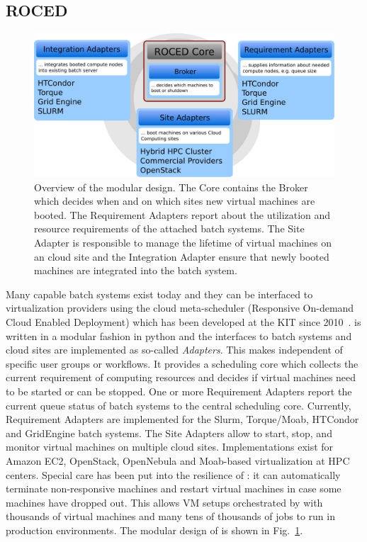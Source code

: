 \subsection{ROCED}
\begin{figure}
\begin{center}
  \includegraphics[width=0.9\linewidth]{figures/roced_design_flat.pdf}
  \caption{Overview of the \Roced modular design. The  \Roced Core contains the Broker which decides when and on which sites new virtual machines are booted. The Requirement Adapters report about the utilization and resource requirements of the attached batch systems. The Site Adapter is responsible to manage the lifetime of virtual machines on an cloud site and the Integration Adapter ensure that newly booted machines are integrated into the batch system.}
  \label{fig-roced}
\end{center}
\end{figure}

Many capable batch systems exist today and they can be interfaced to virtualization providers using the cloud meta-scheduler \Roced (Responsive On-demand Cloud Enabled Deployment) which has been developed at the KIT since 2010~\cite{ROCED}. \Roced is written in a modular
fashion in python and the interfaces to batch systems and cloud sites
are implemented as so-called \textit{Adapters}. This makes \Roced
independent of specific user groups or workflows. It provides a
scheduling core which collects the current requirement of computing
resources and decides if virtual machines need to be started or can be
stopped. One or more Requirement Adapters report the current queue
status of batch systems to the central scheduling core. Currently,
Requirement Adapters are implemented for the Slurm, Torque/Moab, HTCondor
and GridEngine batch systems. The Site Adapters allow \Roced to start,
stop, and monitor virtual machines on multiple cloud
sites. Implementations exist for Amazon EC2, OpenStack, OpenNebula and
Moab-based virtualization at HPC centers. Special care has been put
into the resilience of \Roced: it can automatically terminate
non-responsive machines and restart virtual machines in case some
machines have dropped out. This allows VM setups orchestrated by \Roced with thousands of virtual machines and many tens of thousands of jobs to run in production environments.
The modular design of \Roced is shown in Fig.~\ref{fig-roced}.

